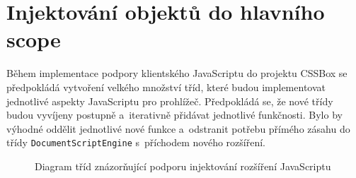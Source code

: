 \section{Injektování objektů do hlavního scope }
\label{Chapter.Design.GlobalScopeInjections}

Během implementace podpory klientského JavaScriptu do projektu CSSBox se předpokládá vytvoření velkého množství tříd, které budou implementovat jednotlivé aspekty JavaScriptu pro prohlížeč. Předpokládá se, že nové třídy budou vyvíjeny postupně a~iterativně přidávat jednotlivé funkčnosti. Bylo by výhodné oddělit jednotlivé nové funkce a~odstranit potřebu přímého zásahu do třídy \texttt{DocumentScriptEngine} s~příchodem nového rozšíření.

\begin{figure}[H]
  \begin{center}
    \caption{Diagram tříd znázorňující podporu injektování rozšíření JavaScriptu}
    \label{Figure.GlobalScopeInjectionsDesign}
  \end{center}
\end{figure}

